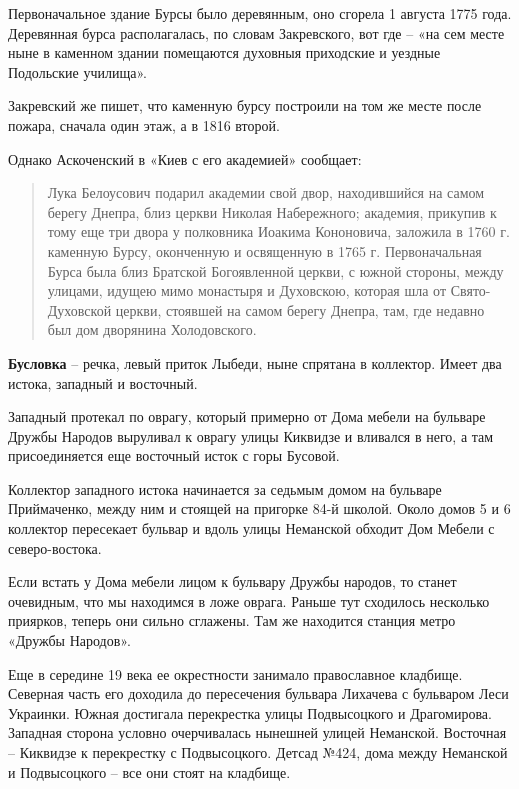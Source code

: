 Первоначальное здание Бурсы было деревянным, оно сгорела 1 августа 1775 года. Деревянная бурса располагалась, по словам Закревского, вот где – «на сем месте ныне в каменном здании помещаются духовныя приходские и уездные Подольские училища». 

Закревский же пишет, что каменную бурсу построили на том же месте после пожара, сначала один этаж, а в 1816 второй.

Однако Аскоченский в «Киев с его академией» сообщает:

\begin{quotation}
Лука Белоусович подарил академии свой двор, находившийся на самом берегу Днепра, близ церкви Николая Набережного; академия, прикупив к тому еще три двора у полковника Иоакима Кононовича, заложила в 1760 г. каменную Бурсу, оконченную и освященную в 1765 г. Первоначальная Бурса была близ Братской Богоявленной церкви, с южной стороны, между улицами, идущею мимо монастыря и Духовскою, которая шла от Свято-Духовской церкви, стоявшей на самом берегу Днепра, там, где недавно был дом дворянина Холодовского.\end{quotation}

\medskip

\textbf{Бусловка} – речка, левый приток Лыбеди, ныне спрятана в коллектор. Имеет два истока, западный и восточный.

Западный протекал по оврагу, который примерно от Дома мебели на бульваре Дружбы Народов выруливал к оврагу улицы Киквидзе и вливался в него, а там присоединяется еще восточный исток с горы Бусовой.

Коллектор западного истока начинается за седьмым домом на бульваре Приймаченко, между ним и стоящей на пригорке 84-й школой. Около домов 5 и 6 коллектор пересекает бульвар и вдоль улицы Неманской обходит Дом Мебели с северо-востока.

Если встать у Дома мебели лицом к бульвару Дружбы народов, то станет очевидным, что мы находимся в ложе оврага. Раньше тут сходилось несколько приярков, теперь они сильно сглажены. Там же находится станция метро «Дружбы Народов». 

Еще в середине 19 века ее окрестности занимало православное кладбище. Северная часть его доходила до пересечения бульвара Лихачева с бульваром Леси Украинки. Южная достигала перекрестка улицы Подвысоцкого и Драгомирова. Западная сторона условно очерчивалась нынешней улицей Неманской. Восточная – Киквидзе к перекрестку с Подвысоцкого. Детсад №424, дома между Неманской и Подвысоцкого – все они стоят на кладбище.

